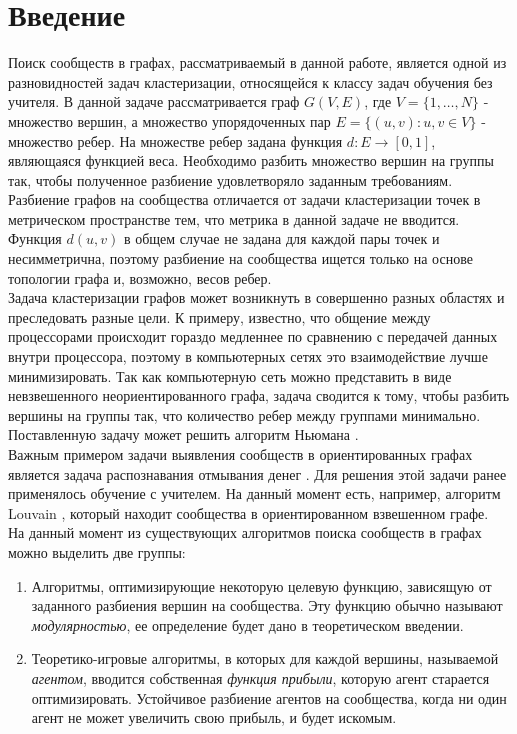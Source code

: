 \chapter{Введение}

Поиск сообществ в графах, рассматриваемый в данной работе, является одной из разновидностей задач кластеризации, относящейся к классу задач обучения без учителя. В данной задаче рассматривается граф $G(V, E)$, где $V=\{1,\dots,N\}$ - множество вершин, а множество упорядоченных пар $E=\{(u,v): u,v\in V\}$ - множество ребер. На множестве ребер задана функция $d:E\rightarrow [0,1]$, являющаяся функцией веса. Необходимо разбить множество вершин на группы так, чтобы полученное разбиение удовлетворяло заданным требованиям. Разбиение графов на сообщества отличается от задачи кластеризации точек в метрическом пространстве тем, что метрика в данной задаче не вводится. Функция $d(u,v)$ в общем случае не задана для каждой пары точек и несимметрична, поэтому разбиение на сообщества ищется только на основе топологии графа и, возможно, весов ребер. \\

Задача кластеризации графов может возникнуть в совершенно разных областях и преследовать разные цели. К примеру, известно, что общение между процессорами происходит гораздо медленнее по сравнению с передачей данных внутри процессора, поэтому в компьютерных сетях это взаимодействие лучше минимизировать. Так как компьютерную сеть можно представить в виде невзвешенного неориентированного графа, задача сводится к тому, чтобы разбить вершины на группы так, что количество ребер между группами минимально. Поставленную задачу может решить алгоритм Ньюмана \cite{Newman2004}.\\

Важным примером задачи выявления сообществ в ориентированных графах является задача распознавания отмывания денег \cite{ml}. Для решения этой задачи ранее применялось обучение с учителем. На данный момент есть, например, алгоритм Louvain \cite{ml1}, который находит сообщества в ориентированном взвешенном графе.\\

На данный момент из существующих алгоритмов поиска сообществ в графах можно выделить две группы: 
\begin{enumerate}
	\item Алгоритмы, оптимизирующие некоторую целевую функцию, зависящую от заданного разбиения вершин на сообщества. Эту функцию обычно называют \textit{модулярностью}, ее определение будет дано в теоретическом введении.
	
	\item Теоретико-игровые алгоритмы, в которых для каждой вершины, называемой \textit{агентом}, вводится собственная \textit{функция прибыли}, которую агент старается оптимизировать. Устойчивое разбиение агентов на сообщества, когда ни один агент не может увеличить свою прибыль, и будет искомым.
\end{enumerate} 

